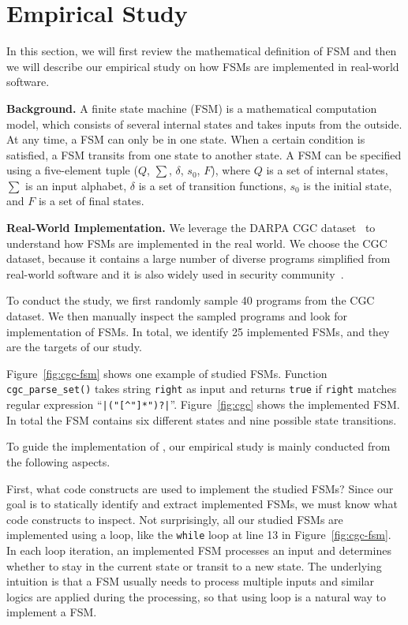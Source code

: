 \section{Empirical Study}
\label{sec:study}
In this section, we will first review the mathematical definition of FSM and then
we will describe our empirical study on how FSMs are implemented 
in real-world software. 

\noindent\textbf{Background.}
A finite state machine (FSM) is a mathematical computation model, 
which consists of several internal states and takes inputs from the outside.
At any time, a FSM can only be in one state. 
When a certain condition is satisfied, 
a FSM transits from one state to another state. 
A FSM can be specified using a five-element tuple ($Q$, $\sum$, $\delta$, $s_0$, $F$),
where $Q$ is a set of internal states, $\sum$ is an input alphabet, 
$\delta$ is a set of transition functions,
$s_0$ is the initial state, and $F$ is a set of final states. 

\noindent\textbf{Real-World Implementation.}
We leverage the DARPA CGC dataset~\cite{CGC} to 
understand how FSMs are implemented in the real world. 
We choose the CGC dataset, because it 
contains a large number of diverse programs simplified 
from real-world software and it 
is also widely used in security 
community~\cite{QSYM, Driller, VUzzer}. 


To conduct the study, we first randomly sample 
40 programs from the CGC dataset.
We then manually inspect the sampled programs and look for implementation of FSMs.
In total, we identify 25 implemented FSMs, 
and they are the targets of our study.

Figure~\ref{fig:cgc-fsm} shows one example of studied FSMs.
Function \texttt{cgc\_parse\_set()} takes string \texttt{right} 
as input and returns \texttt{true} if \texttt{right} matches 
regular expression ``\verb/|("[^"]*")?|/''. 
Figure~\ref{fig:cgc} shows the implemented FSM. 
In total the FSM contains six different states 
and nine possible state transitions. 





To guide the implementation of \Tool{}, our empirical study 
is mainly conducted from the following aspects.


First, what code constructs are used to implement the studied FSMs?
Since our goal is to statically identify and extract implemented FSMs, 
we must know what code constructs to inspect. 
Not surprisingly, all our studied FSMs are implemented using a loop, 
like the \texttt{while} loop at line 13 in Figure~\ref{fig:cgc-fsm}.  
In each loop iteration, an implemented FSM processes an input and 
determines whether to stay in the current state or transit to a new state. 
The underlying intuition is that a FSM usually needs to process 
multiple inputs and similar logics are applied during the processing, 
so that using loop is a natural way to implement a FSM. 

